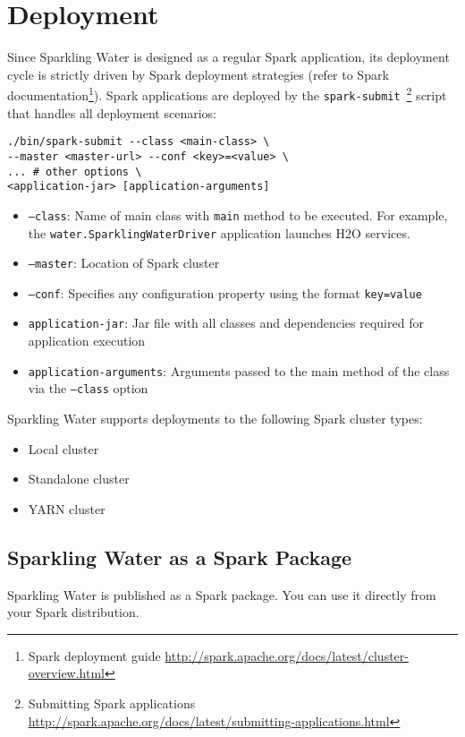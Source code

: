 \section{Deployment}
Since Sparkling Water is designed as a regular Spark application, its deployment cycle is strictly driven by Spark deployment strategies (refer to Spark documentation\footnote{Spark deployment guide \url{http://spark.apache.org/docs/latest/cluster-overview.html}}). Spark applications are deployed by the \texttt{spark-submit}~\footnote{Submitting Spark applications \url{http://spark.apache.org/docs/latest/submitting-applications.html}} script that handles all deployment scenarios:

\begin{lstlisting}[style=Bash]
./bin/spark-submit --class <main-class> \
--master <master-url> --conf <key>=<value> \
... # other options \
<application-jar> [application-arguments]
\end{lstlisting}

\begin{itemize}
	\item \texttt{--class}: Name of main class with \texttt{main} method to be executed. For example, the \texttt{water.SparklingWaterDriver} application launches H2O services.
	\item \texttt{--master}: Location of Spark cluster
	\item \texttt{--conf}: Specifies any configuration property using the format \texttt{key=value}
	\item \texttt{application-jar}: Jar file with all classes and dependencies required for application execution
	\item \texttt{application-arguments}: Arguments passed to the main method of the class via the \texttt{--class} option
\end{itemize}


Sparkling Water supports deployments to the following Spark cluster types:
\begin{itemize}
	\item{Local cluster}
	\item{Standalone cluster} 
	\item{YARN cluster}
\end{itemize}

\subsection{Sparkling Water as a Spark Package}

Sparkling Water is published as a Spark package. You can use it directly from your Spark distribution.

